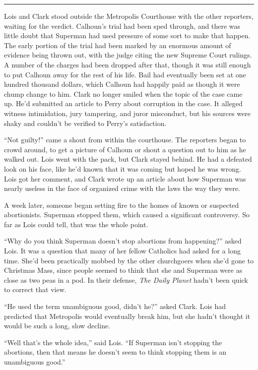\begin{center}\rule{0.5\linewidth}{0.5pt}\end{center}

Lois and Clark stood outside the Metropolis Courthouse with the other
reporters, waiting for the verdict. Calhoun's trial had been sped
through, and there was little doubt that Superman had used pressure of
some sort to make that happen. The early portion of the trial had been
marked by an enormous amount of evidence being thrown out, with the
judge citing the new Supreme Court rulings. A number of the charges had
been dropped after that, though it was still enough to put Calhoun away
for the rest of his life. Bail had eventually been set at one hundred
thousand dollars, which Calhoun had happily paid as though it were chump
change to him. Clark no longer smiled when the topic of the case came
up. He'd submitted an article to Perry about corruption in the case. It
alleged witness intimidation, jury tampering, and juror misconduct, but
his sources were shaky and couldn't be verified to Perry's satisfaction.

``Not guilty!'' came a shout from within the courthouse. The reporters
began to crowd around, to get a picture of Calhoun or shout a question
out to him as he walked out. Lois went with the pack, but Clark stayed
behind. He had a defeated look on his face, like he'd known that it was
coming but hoped he was wrong. Lois got her comment, and Clark wrote up
an article about how Superman was nearly useless in the face of
organized crime with the laws the way they were.

A week later, someone began setting fire to the homes of known or
suspected abortionists. Superman stopped them, which caused a
significant controversy. So far as Lois could tell, that was the whole
point.

``Why do you think Superman doesn't stop abortions from happening?''
asked Lois. It was a question that many of her fellow Catholics had
asked for a long time. She'd been practically mobbed by the other
churchgoers when she'd gone to Christmas Mass, since people seemed to
think that she and Superman were as close as two peas in a pod. In their
defense, \emph{The Daily Planet} hadn't been quick to correct that view.

``He used the term unambiguous good, didn't he?'' asked Clark. Lois had
predicted that Metropolis would eventually break him, but she hadn't
thought it would be such a long, slow decline.

``Well that's the whole idea,'' said Lois. ``If Superman isn't stopping
the abortions, then that means he doesn't seem to think stopping them is
an unambiguous good.''

